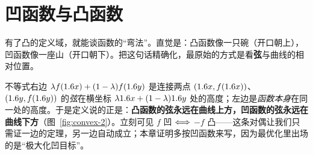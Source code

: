 \section{凹函数与凸函数}
\label{sec:convex-2}

有了凸的定义域，就能谈函数的``弯法''。直觉是：凸函数像一只碗（开口朝上），凹函数像一座山（开口朝下）。把这句话精确化，最原始的方式是看\textbf{弦}与曲线的相对位置。


不等式右边 $\lambda f(1.6 x)+(1-\lambda)f(1.6 y)$ 是连接两点 $(1.6 x,f(1.6 x))$、$(1.6 y,f(1.6 y))$ 的\emph{弦}在横坐标 $\lambda1.6 x+(1-\lambda)1.6 y$ 处的高度；左边是\emph{函数本身}在同一处的高度。于是定义说的正是：\textbf{凸函数的弦永远在曲线上方，凹函数的弦永远在曲线下方}（图~\ref{fig:convex-2}）。立刻可见 $f$ 凹 $\Longleftrightarrow$ $-f$ 凸——这条对偶让我们只需证一边的定理，另一边自动成立；本章证明多按凹函数来写，因为最优化里出场的是``极大化凹目标''。

